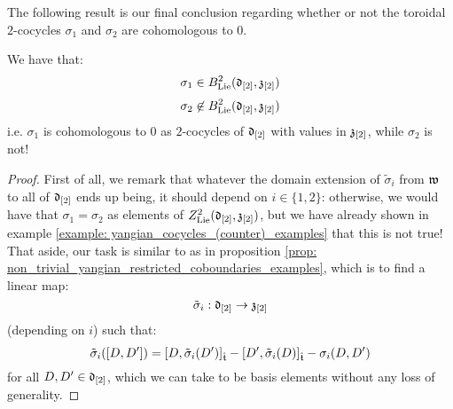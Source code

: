         The following result is our final conclusion regarding whether or not the toroidal $2$-cocycles $\sigma_1$ and $\sigma_2$ are cohomologous to $0$.
        \begin{theorem} \label{theorem: non_trivial_yangian_cocycles_examples}
            We have that:
                $$\sigma_1 \in B^2_{\mathrm{Lie}}(\mathfrak{d}_{[2]}, \mathfrak{z}_{[2]})$$
                $$\sigma_2 \not \in B^2_{\mathrm{Lie}}(\mathfrak{d}_{[2]}, \mathfrak{z}_{[2]})$$
            i.e. $\sigma_1$ is cohomologous to $0$ as $2$-cocycles of $\mathfrak{d}_{[2]}$ with values in $\mathfrak{z}_{[2]}$, while $\sigma_2$ is not!
        \end{theorem}
            \begin{proof}
                First of all, we remark that whatever the domain extension of $\tilde{\sigma}_i$ from $\mathfrak{w}$ to all of $\mathfrak{d}_{[2]}$ ends up being, it should depend on $i \in \{1, 2\}$: otherwise, we would have that $\sigma_1 = \sigma_2$ as elements of $Z^2_{\mathrm{Lie}}(\mathfrak{d}_{[2]}, \mathfrak{z}_{[2]})$, but we have already shown in example \ref{example: yangian_cocycles_(counter)_examples} that this is not true! That aside, our task is similar to as in proposition \ref{prop: non_trivial_yangian_restricted_coboundaries_examples}, which is to find a linear map:
                    $$\tilde{\sigma}_i: \mathfrak{d}_{[2]} \to \mathfrak{z}_{[2]}$$
                (depending on $i$) such that:
                    $$\tilde{\sigma}_i([D, D']) = [D, \tilde{\sigma}_i(D')]_{\hat{\mathfrak{t}}} - [D', \tilde{\sigma}_i(D)]_{\hat{\mathfrak{t}}} - \sigma_i(D, D')$$
                for all $D, D' \in \mathfrak{d}_{[2]}$, which we can take to be basis elements without any loss of generality.


\end{proof}
